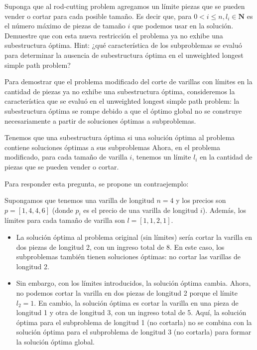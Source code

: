 





\begin{problema}
    Suponga que al rod-cutting problem agregamos un límite piezas que se pueden vender o cortar para cada posible tamaño. Es decir que, para $0<i \leq n, l_{i} \in \mathbf{N}$ es el número máximo de piezas de tamaño $i$ que podemos usar en la solución. Demuestre que con esta nueva restricción el problema ya no exhibe una subestructura óptima. Hint: ¿qué característica de los subproblemas se evaluó para determinar la ausencia de subestructura óptima en el unweighted longest simple path problem?
    \begin{sol}
        Para demostrar que el problema modificado del corte de varillas con límites en la cantidad de piezas ya no exhibe una subestructura óptima, consideremos la característica que se evaluó en el unweighted longest simple path problem: la subestructura óptima se rompe debido a que el óptimo global no se construye necesariamente a partir de soluciones óptimas a subproblemas.\bigbreak

        Tenemos que una subestructura óptima si una solución óptima al problema contiene soluciones óptimas a sus subproblemas Ahora, en el problema modificado, para cada tamaño de varilla $i$, tenemos un límite $l_i$ en la cantidad de piezas que se pueden vender o cortar.\bigbreak

        Para responder esta pregunta, se propone un contraejemplo:\bigbreak
        
        Supongamos que tenemos una varilla de longitud $n = 4$ y los precios son $p = [1, 4, 4, 6]$ (donde $p_i$ es el precio de una varilla de longitud $i$). Además, los límites para cada tamaño de varilla son $l = [1, 1, 2, 1]$. 
        \begin{itemize}
            \item La solución óptima al problema original (sin límites) sería cortar la varilla en dos piezas de longitud 2, con un ingreso total de 8. En este caso, los subproblemas también tienen soluciones óptimas: no cortar las varillas de longitud 2.

            \item Sin embargo, con los límites introducidos, la solución óptima cambia. Ahora, no podemos cortar la varilla en dos piezas de longitud 2 porque el límite $l_2 = 1$. En cambio, la solución óptima es cortar la varilla en una pieza de longitud 1 y otra de longitud 3, con un ingreso total de 5. Aquí, la solución óptima para el subproblema de longitud 1 (no cortarla) no se combina con la solución óptima para el subproblema de longitud 3 (no cortarla) para formar la solución óptima global.
        \end{itemize}


\end{sol}
\end{problema}
